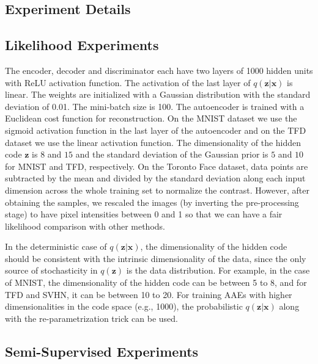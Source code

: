 \documentclass{article}
\begin{document}
\begin{appendices}


\section{Experiment Details}\label{exp:details}

\subsection{Likelihood Experiments}
The encoder, decoder and discriminator each have two layers of 1000 hidden units with ReLU activation function. The activation of the last layer of $q(\mathbf{z}|\mathbf{x})$ is linear. 
The weights are initialized with a Gaussian distribution with the standard deviation of 0.01. 
The mini-batch size is 100.
The autoencoder is trained with a Euclidean cost function for reconstruction.
On the MNIST dataset we use the sigmoid activation function in the last layer of the autoencoder and on the TFD dataset we use the linear activation function.
The dimensionality of the hidden code $\mathbf{z}$ is $8$ and $15$ and the standard deviation of the Gaussian prior is $5$ and $10$ for MNIST and TFD, respectively. On the Toronto Face dataset, data points are subtracted by the mean and divided by the standard deviation along each input dimension across the whole training set to normalize the contrast. However, after obtaining the samples, we rescaled the images (by inverting the pre-processing stage) to have pixel intensities between 0 and 1 so that we can have a fair likelihood comparison with other methods.

In the deterministic case of $q(\mathbf{z}|\mathbf{x})$, the dimensionality of the hidden code should be consistent with the intrinsic dimensionality of the data, since the only source of stochasticity in $q(\mathbf{z})$ is the data distribution. For example, in the case of MNIST, the dimensionality of the hidden code can be between 5 to 8, and for TFD and SVHN, it can be between 10 to 20. For training AAEs with higher dimensionalities in the code space (e.g., 1000), the probabilistic $q(\mathbf{z}|\mathbf{x})$ along with the re-parametrization trick can be used.

\subsection{Semi-Supervised Experiments}

\end{appendices}
\end{document}
